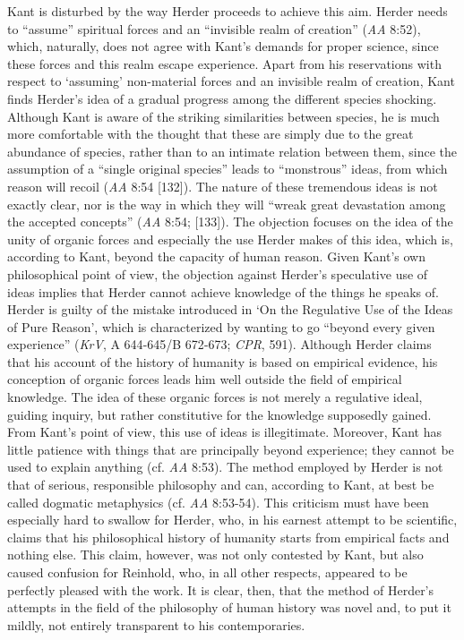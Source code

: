 Kant is disturbed by the way Herder proceeds to achieve this aim. Herder needs to ``assume'' spiritual forces and an ``invisible realm of creation'' (\textit{AA} 8:52), which, naturally, does not agree with Kant's demands for proper science, since these forces and this realm escape experience. Apart from his reservations with respect to `assuming' non{-}material forces and an invisible realm of creation, Kant finds Herder's idea of a gradual progress among the different species shocking. Although Kant is aware of the striking similarities between species, he is much more comfortable with the thought that these are simply due to the great abundance of species, rather than to an intimate relation between them, since the assumption of a ``single original species'' leads to ``monstrous'' ideas, from which reason will recoil (\textit{AA} 8:54 [132]). The nature of these tremendous ideas is not exactly clear, nor is the way in which they will ``wreak great devastation among the accepted concepts'' (\textit{AA} 8:54; [133]). The objection focuses on the idea of the unity of organic forces and especially the use Herder makes of this idea, which is, according to Kant, beyond the capacity of human reason. Given Kant's own philosophical point of view, the objection against Herder's speculative use of ideas implies that Herder cannot achieve knowledge of the things he speaks of. Herder is guilty of the mistake introduced in `On the Regulative Use of the Ideas of Pure Reason', which is characterized by wanting to go ``beyond every given experience'' (\textit{KrV}, A 644{-}645/B 672{-}673; \textit{CPR}, 591). Although Herder claims that his account of the history of humanity is based on empirical evidence, his conception of organic forces leads him well outside the field of empirical knowledge. The idea of these organic forces is not merely a regulative ideal, guiding inquiry, but rather constitutive for the knowledge supposedly gained. From Kant's point of view, this use of ideas is illegitimate. Moreover, Kant has little patience with things that are principally beyond experience; they cannot be used to explain anything (cf. \textit{AA} 8:53). The method employed by Herder is not that of serious, responsible philosophy and can, according to Kant, at best be called dogmatic metaphysics (cf. \textit{AA} 8:53{-}54). This criticism must have been especially hard to swallow for Herder, who, in his earnest attempt to be scientific, claims that his philosophical history of humanity starts from empirical facts and nothing else. This claim, however, was not only contested by Kant, but also caused confusion for Reinhold, who, in all other respects, appeared to be perfectly pleased with the work. It is clear, then, that the method of Herder's attempts in the field of the philosophy of human history was novel and, to put it mildly, not entirely transparent to his contemporaries. 

